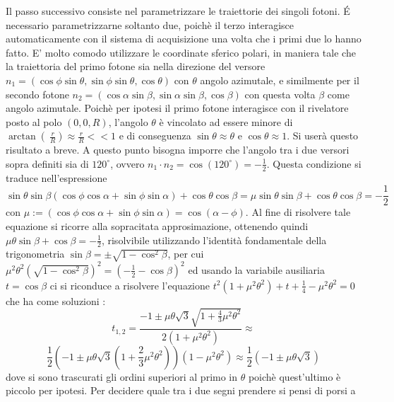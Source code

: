   Il passo successivo consiste nel parametrizzare le traiettorie dei singoli fotoni. \'E necessario parametrizzarne soltanto due, poichè il terzo interagisce automaticamente con il
  sistema di acquisizione una volta che i primi due lo hanno fatto. E' molto comodo utilizzare le coordinate sferico polari, in maniera tale che la traiettoria del primo fotone sia 
  nella direzione del versore \(n_1 = \left( \cos \phi \sin \theta , \sin \phi \sin \theta, \cos \theta  \right)\) con \(\theta\) angolo azimutale, e similmente per il secondo fotone
  \(n_2 = \left( \cos \alpha \sin \beta , \sin \alpha \sin \beta, \cos \beta  \right)\) con questa volta \(\beta\) come angolo azimutale. Poichè per ipotesi il primo fotone
  interagisce con il rivelatore posto al polo \(\left(0,0,R \right)\), l'angolo \(\theta\) è vincolato ad essere minore di \(\arctan\left(\ \frac{r}{R} \right) \approx \frac{r}{R} << 1 \)
  e di conseguenza \(\sin \theta \approx \theta \) e \(\cos \theta \approx 1 \). Si userà questo risultato a breve. A questo punto bisogna imporre che l'angolo tra i due versori sopra 
  definiti sia di \(120^\circ\), ovvero \(n_1 \cdot n_2 = \cos (120^\circ) = -\frac{1}{2}\). Questa condizione si traduce nell'espressione \[\sin \theta \sin \beta \left( \cos \phi \cos \alpha
  + \sin \phi \sin \alpha \right) + \cos \theta \cos \beta = \mu \sin \theta \sin \beta  + \cos \theta \cos \beta =-\frac{1}{2}\] con \(\mu := \left( \cos \phi \cos \alpha + 
  \sin \phi \sin \alpha \right) = \cos \left( \alpha - \phi \right) \). Al fine di risolvere tale equazione si ricorre alla sopracitata approsimazione, ottenendo quindi 
  \( \mu \theta \sin \beta + \cos \beta = -\frac{1}{2}\), risolvibile utilizzando l'identità fondamentale della trigonometria \(\sin \beta = \pm \sqrt{1 - \cos^2 \beta}\), per cui
  \(\mu^2 \theta^2 \left( \sqrt{ 1 - \cos^2 \beta } \right)^2 = \left( -\frac{1}{2} - \cos \beta \right)^2  \) ed usando la variabile ausiliaria \(t = \cos \beta\) ci si riconduce 
  a risolvere l'equazione \(t^2 \left( 1 + \mu^2 \theta^2 \right) + t + \frac{1}{4} - \mu^2 \theta^2=0\) che ha come soluzioni :
  $$ t_{1,2} = \frac{-1 \pm \mu \theta \sqrt{3} \sqrt{1 + \frac{4}{3} \mu^2 \theta^2 }}{2\left( 1 + \mu^2 \theta^2 \right)} \approx$$
  $$ \frac{1}{2}\left(-1 \pm \mu \theta \sqrt{3} \left(1 + \frac{2}{3} \mu^2 \theta^2 \right)\right)\left( 1 - \mu^2 \theta^2 \right) \approx \frac{1}{2} \left( -1 \pm \mu \theta \sqrt{3} \right)$$
  dove si sono trascurati gli ordini superiori al primo in \(\theta\) poichè quest'ultimo è piccolo per ipotesi. Per decidere quale tra i due segni prendere si pensi di porsi a
